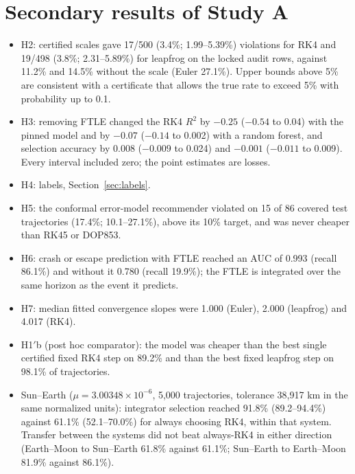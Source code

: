 \documentclass[10pt,letterpaper]{article}
\begin{document}
\section{Secondary results of Study A}
\label{sec:studya}
\begin{itemize}
\item H2: certified scales gave 17/500 (3.4\%; 1.99--5.39\%) violations for RK4 and 19/498 (3.8\%; 2.31--5.89\%) for leapfrog on the locked audit rows,
against 11.2\% and 14.5\% without the scale (Euler 27.1\%). Upper bounds above 5\% are consistent with a certificate that allows the true rate to
exceed 5\% with probability up to 0.1.
\item H3: removing FTLE changed the RK4 $R^2$ by $-0.25$ ($-0.54$ to 0.04) with the pinned model and by $-0.07$ ($-0.14$ to 0.002) with a random forest,
and selection accuracy by 0.008 ($-0.009$ to 0.024) and $-0.001$ ($-0.011$ to 0.009). Every interval included zero; the point estimates are losses.
\item H4: labels, Section~\ref{sec:labels}.
\item H5: the conformal error-model recommender violated on 15 of 86 covered test trajectories (17.4\%; 10.1--27.1\%), above its 10\% target, and was
never cheaper than RK45 or DOP853.
\item H6: crash or escape prediction with FTLE reached an AUC of 0.993 (recall 86.1\%) and without it 0.780 (recall 19.9\%); the FTLE is integrated over
the same horizon as the event it predicts.
\item H7: median fitted convergence slopes were 1.000 (Euler), 2.000 (leapfrog) and 4.017 (RK4).
\item H1$'$b (post hoc comparator): the model was cheaper than the best single certified fixed RK4 step on 89.2\% and than the best fixed leapfrog step on
98.1\% of trajectories.
\item Sun--Earth ($\mu = 3.00348\times10^{-6}$, 5,000 trajectories, tolerance 38,917 km in the same normalized units): integrator selection reached
91.8\% (89.2--94.4\%) against 61.1\% (52.1--70.0\%) for always choosing RK4, within that system. Transfer between the systems did not beat always-RK4
in either direction (Earth--Moon to Sun--Earth 61.8\% against 61.1\%; Sun--Earth to Earth--Moon 81.9\% against 86.1\%).
\end{itemize}
\end{document}

